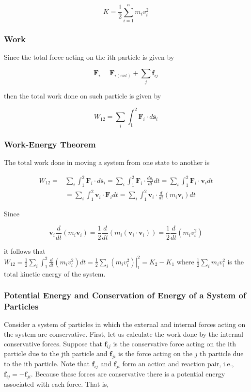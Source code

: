 \documentclass[10pt]{article}
\numberwithin{equation}{section}
\begin{document}
$$
K=\frac{1}{2} \sum_{i=1}^{n} m_{i} v_{i}^{2}
$$

\subsubsection{Work}\label{sec:6-3-14}
Since the total force acting on the ith particle is given by

$$
\mathbf{F}_{i}=\mathbf{F}_{i(e x t)}+\sum_{j} \mathbf{f}_{i j}
$$

then the total work done on such particle is given by

$$
W_{12}=\sum_{i} \int_{1}^{2} \mathbf{F}_{i} \cdot d \mathbf{s}_{i}
$$

\subsubsection{Work-Energy Theorem}\label{sec:6-3-15}
The total work done in moving a system from one state to another is

$$
\begin{aligned}
W_{12}= & \sum_{i} \int_{1}^{2} \mathbf{F}_{i} \cdot d \mathbf{s}_{i}=\sum_{i} \int_{1}^{2} \mathbf{F}_{i} \cdot \frac{d \mathbf{s}_{i}}{d t} d t=\sum_{i} \int_{1}^{2} \mathbf{F}_{i} \cdot \mathbf{v}_{i} d t \\
& =\sum_{i} \int_{1}^{2} \mathbf{v}_{i} \cdot \mathbf{F}_{i} d t=\sum_{i} \int_{1}^{2} \mathbf{v}_{i} \cdot \frac{d}{d t}\left(m_{i} \mathbf{v}_{i}\right) d t
\end{aligned}
$$

Since

$$
\mathbf{v}_{i} \frac{d}{d t}\left(m_{i} \mathbf{v}_{i}\right)=\frac{1}{2} \frac{d}{d t}\left(m_{i}\left(\mathbf{v}_{i} \cdot \mathbf{v}_{i}\right)\right)=\frac{1}{2} \frac{d}{d t}\left(m_{i} v_{i}^{2}\right)
$$

it follows that\\
$W_{12}=\frac{1}{2} \sum_{i} \int_{1}^{2} \frac{d}{d t}\left(m_{i} v_{i}^{2}\right) d t=\left.\frac{1}{2} \sum_{i}\left(m_{i} v_{i}^{2}\right)\right|_{1} ^{2}=K_{2}-K_{1}$ where $\frac{1}{2} \sum_{i} m_{i} v_{i}^{2}$ is the total kinetic energy of the system.

\subsubsection{Potential Energy and Conservation of Energy of a System of Particles}\label{sec:6-3-16}
Consider a system of particles in which the external and internal forces acting on the system are conservative. First, let us calculate the work done by the internal conservative forces. Suppose that $\mathbf{f}_{i j}$ is the conservative force acting on the ith particle due to the jth particle and $\mathbf{f}_{j i}$ is the force acting on the $j$ th particle due to the ith particle. Note that $\mathbf{f}_{i j}$ and $\mathbf{f}_{j i}$ form an action and reaction pair, i.e., $\mathbf{f}_{i j}=-\mathbf{f}_{j i}$. Because these forces are conservative there is a potential energy associated with each force. That is,
\end{document}
